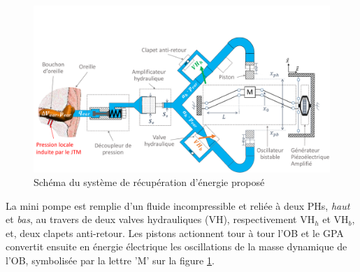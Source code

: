 \begin{figure}[!htbp]
	\begin{center}
		\captionsetup{justification=centering}
		\includegraphics[trim={0cm 0cm 0cm 3.5cm},clip, width=\textwidth]{../Chap2/Figure/schema_systeme_complet_decoupleur.pdf}
		\caption{Schéma du système de récupération d'énergie proposé}
		\label{fig:schema_systeme_complet}
	\end{center}
\end{figure}

La mini pompe est remplie d'un fluide incompressible et reliée à deux PHs, \emph{haut} et \emph{bas}, au travers de deux valves hydrauliques (VH), respectivement VH$_h$ et VH$_b$, et, deux clapets anti-retour. Les pistons actionnent tour à tour l'OB et le GPA convertit ensuite en énergie électrique les oscillations de la masse dynamique de l'OB, symbolisée par la lettre 'M' sur la figure \ref{fig:schema_systeme_complet}. 

